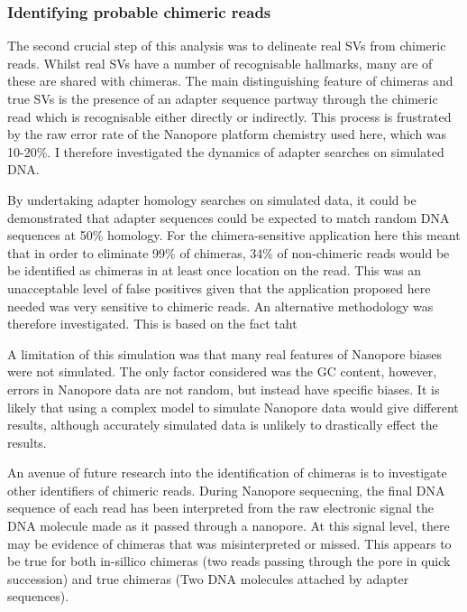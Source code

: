 \documentclass{article}
\begin{document}
\subsubsection{Identifying probable chimeric reads}

The second crucial step of this analysis was to delineate real SVs from chimeric reads. Whilst real SVs have a number of recognisable hallmarks, many are of these are  shared with chimeras. The main distinguishing feature of chimeras and true SVs is the presence of an adapter sequence partway through the chimeric read which is   recognisable either directly or indirectly. This process is frustrated by the raw error rate of the Nanopore platform chemistry used here, which was 10-20\%.  I therefore investigated the dynamics of adapter searches on simulated DNA.

By undertaking adapter homology searches on simulated data, it could be demonstrated that adapter sequences could be expected to match random DNA sequences at 50\% homology. For the chimera-sensitive application here this meant that in order to eliminate 99\% of chimeras, 34\% of non-chimeric reads would be be identified as chimeras in at least once location on the read. This was an unacceptable level of false positives  given that the application proposed here needed was very sensitive to chimeric reads. An alternative methodology was therefore investigated. This is based on the fact taht

A limitation of this simulation was that many real features of Nanopore biases were not simulated. The only factor considered was the GC content, however, errors in Nanopore data are not random, but instead have specific biases. It is likely that using a complex model to simulate Nanopore data would give different results, although accurately simulated data is unlikely to drastically effect the results. 



An avenue of future research into the identification of chimeras is to investigate other identifiers of chimeric reads. During Nanopore sequecning, the final DNA sequence of each read has been interpreted from the raw electronic signal the DNA molecule made as it passed through a nanopore. At this signal level, there may be evidence of chimeras that was misinterpreted or missed. This appears to be true for both in-sillico chimeras (two reads passing through the pore in quick succession) and true chimeras (Two DNA molecules attached by adapter sequences).
\end{document}
